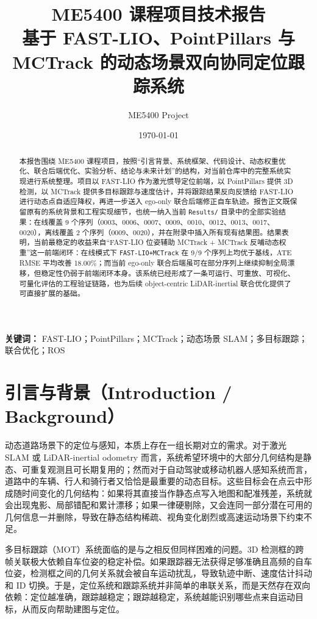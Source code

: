 \documentclass[UTF8,a4paper,12pt]{ctexart}
\title{ME5400 课程项目技术报告\\基于 FAST-LIO、PointPillars 与 MCTrack 的动态场景双向协同定位跟踪系统}
\author{ME5400 Project}
\date{\today}
\begin{document}
\maketitle

\begin{abstract}
本报告围绕 ME5400 课程项目，按照“引言背景、系统框架、代码设计、动态权重优化、联合后端优化、实验分析、结论与未来计划”的结构，对当前仓库中的完整系统实现进行系统整理。项目以 FAST-LIO 作为激光惯导定位前端，以 PointPillars 提供 3D 检测，以 MCTrack 提供多目标跟踪与速度估计，并将跟踪结果反向反馈给 FAST-LIO 进行动态点自适应降权，再进一步送入 ego-only 联合后端修正自车轨迹。报告正文既保留原有的系统背景和工程实现细节，也统一纳入当前 \texttt{Results/} 目录中的全部实验结果：在线覆盖 9 个序列（0003、0006、0007、0009、0010、0012、0013、0017、0020），离线覆盖 2 个序列（0009、0020），并在附录中插入所有现有结果图。结果表明，当前最稳定的收益来自“FAST-LIO 位姿辅助 MCTrack + MCTrack 反哺动态权重”这一前端闭环：在线模式下 \texttt{FAST-LIO+MCTrack} 在 9/9 个序列上均优于基线，ATE RMSE 平均改善 18.00\%；而当前 ego-only 联合后端虽可在部分序列上继续抑制全局漂移，但稳定性仍弱于前端闭环本身。该系统已经形成了一条可运行、可重放、可视化、可量化评估的工程验证链路，也为后续 object-centric LiDAR-inertial 联合优化提供了可直接扩展的基础。
\end{abstract}

\noindent\textbf{关键词：} FAST-LIO；PointPillars；MCTrack；动态场景 SLAM；多目标跟踪；联合优化；ROS

\section{引言与背景（Introduction / Background）}
动态道路场景下的定位与感知，本质上存在一组长期对立的需求。对于激光 SLAM 或 LiDAR-inertial odometry 而言，系统希望环境中的大部分几何结构是静态、可重复观测且可长期复用的；然而对于自动驾驶或移动机器人感知系统而言，道路中的车辆、行人和骑行者又恰恰是最重要的动态目标。这些目标会在点云中形成随时间变化的几何结构：如果将其直接当作静态点写入地图和配准残差，系统就会出现鬼影、局部错配和累计漂移；如果一律硬剔除，又会连同一部分潜在可用的几何信息一并删除，导致在静态结构稀疏、视角变化剧烈或高速运动场景下约束不足。

多目标跟踪（MOT）系统面临的是与之相反但同样困难的问题。3D 检测框的跨帧关联极大依赖自车位姿的稳定补偿。如果跟踪器无法获得足够准确且高频的自车位姿，检测框之间的几何关系就会被自车运动扰乱，导致轨迹中断、速度估计抖动和 ID 切换。于是，定位系统和跟踪系统并非简单的串联关系，而是天然存在双向依赖：定位越准确，跟踪越稳定；跟踪越稳定，系统越能识别哪些点来自运动目标，从而反向帮助建图与定位。
\end{document}
